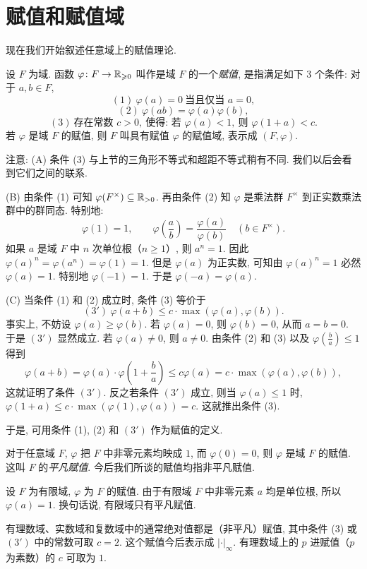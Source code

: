 \section{赋值和赋值域}\label{sec:ch7-s2}

现在我们开始叙述任意域上的赋值理论.

\begin{definition}\label{def:ch7-1}
设 $F$ 为域. 函数 $\varphi\colon F\to\mathbb{R}_{\geqslant 0}$ 叫作是域 $F$ 的一个\emph{赋值}, 是指满足如下 $3$ 个条件: 对于 $a,b\in F$,
\[
  (1)\ \varphi(a)=0\ \text{当且仅当 } a=0,
\]
\[
  (2)\ \varphi(ab)=\varphi(a)\varphi(b),
\]
\[
  (3)\ \text{存在常数 } c>0,\ \text{使得: 若 } \varphi(a)<1,\ \text{则 } \varphi(1+a)<c.
\]
若 $\varphi$ 是域 $F$ 的赋值, 则 $F$ 叫具有赋值 $\varphi$ 的赋值域, 表示成 $(F,\varphi)$.
\end{definition}

注意: (A) 条件 (3) 与上节的三角形不等式和超距不等式稍有不同. 我们以后会看到它们之间的联系.

(B) 由条件 (1) 可知 $\varphi(F^{\times})\subseteq\mathbb{R}_{>0}$. 再由条件 (2) 知 $\varphi$ 是乘法群 $F^{\times}$ 到正实数乘法群中的群同态. 特别地:
\[
  \varphi(1)=1,\qquad\varphi\left(\frac{a}{b}\right)=\frac{\varphi(a)}{\varphi(b)}\quad(b\in F^{\times}).
\]
如果 $a$ 是域 $F$ 中 $n$ 次单位根（$n\geqslant 1$）, 则 $a^n=1$. 因此 $\varphi(a)^n=\varphi(a^n)=\varphi(1)=1$. 但是 $\varphi(a)$ 为正实数, 可知由 $\varphi(a)^n=1$ 必然 $\varphi(a)=1$. 特别地 $\varphi(-1)=1$. 于是 $\varphi(-a)=\varphi(a)$.

(C) 当条件 (1) 和 (2) 成立时, 条件 (3) 等价于
\[
  (3')\ \varphi(a+b)\leqslant c\cdot\max(\varphi(a),\varphi(b)).
\]
事实上, 不妨设 $\varphi(a)\geqslant\varphi(b)$. 若 $\varphi(a)=0$, 则 $\varphi(b)=0$, 从而 $a=b=0$. 于是 $(3')$ 显然成立. 若 $\varphi(a)\neq 0$, 则 $a\neq 0$. 由条件 (2) 和 (3) 以及 $\varphi\left(\frac{b}{a}\right)\leqslant 1$ 得到
\[
  \varphi(a+b)=\varphi(a)\cdot\varphi\left(1+\frac{b}{a}\right)\leqslant c\varphi(a)
  =c\cdot\max(\varphi(a),\varphi(b)),
\]
这就证明了条件 $(3')$. 反之若条件 $(3')$ 成立, 则当 $\varphi(a)\leqslant 1$ 时, $\varphi(1+a)\leqslant c\cdot\max(\varphi(1),\varphi(a))=c$. 这就推出条件 (3).

于是, 可用条件 (1), (2) 和 $(3')$ 作为赋值的定义.

\begin{example}
对于任意域 $F$, $\varphi$ 把 $F$ 中非零元素均映成 $1$, 而 $\varphi(0)=0$, 则 $\varphi$ 是域 $F$ 的赋值. 这叫 $F$ 的\emph{平凡赋值}. 今后我们所谈的赋值均指非平凡赋值.

设 $F$ 为有限域, $\varphi$ 为 $F$ 的赋值. 由于有限域 $F$ 中非零元素 $a$ 均是单位根, 所以 $\varphi(a)=1$. 换句话说, 有限域只有平凡赋值.

有理数域、实数域和复数域中的通常绝对值都是（非平凡）赋值, 其中条件 (3) 或 $(3')$ 中的常数可取 $c=2$. 这个赋值今后表示成 $|\cdot|_{\infty}$. 有理数域上的 $p$ 进赋值（$p$ 为素数）的 $c$ 可取为 $1$.
\end{example}

